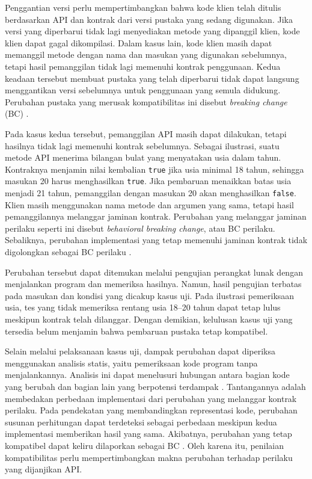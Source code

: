 Penggantian versi perlu mempertimbangkan bahwa kode klien telah ditulis berdasarkan API dan kontrak dari versi pustaka yang sedang digunakan. Jika versi yang diperbarui tidak lagi menyediakan metode yang dipanggil klien, kode klien dapat gagal dikompilasi. Dalam kasus lain, kode klien masih dapat memanggil metode dengan nama dan masukan yang digunakan sebelumnya, tetapi hasil pemanggilan tidak lagi memenuhi kontrak penggunaan. Kedua keadaan tersebut membuat pustaka yang telah diperbarui tidak dapat langsung menggantikan versi sebelumnya untuk penggunaan yang semula didukung. Perubahan pustaka yang merusak kompatibilitas ini disebut \textit{breaking change} (BC) \parencite{Ochoa2023}.

Pada kasus kedua tersebut, pemanggilan API masih dapat dilakukan, tetapi hasilnya tidak lagi memenuhi kontrak sebelumnya. Sebagai ilustrasi, suatu metode API menerima bilangan bulat yang menyatakan usia dalam tahun. Kontraknya menjamin nilai kembalian \texttt{true} jika usia minimal 18 tahun, sehingga masukan 20 harus menghasilkan \texttt{true}. Jika pembaruan menaikkan batas usia menjadi 21 tahun, pemanggilan dengan masukan 20 akan menghasilkan \texttt{false}. Klien masih menggunakan nama metode dan argumen yang sama, tetapi hasil pemanggilannya melanggar jaminan kontrak. Perubahan yang melanggar jaminan perilaku seperti ini disebut \textit{behavioral breaking change}, atau BC perilaku. Sebaliknya, perubahan implementasi yang tetap memenuhi jaminan kontrak tidak digolongkan sebagai BC perilaku \parencite{Ochoa2023,LiskovWing1994}.

Perubahan tersebut dapat ditemukan melalui pengujian perangkat lunak dengan menjalankan program dan memeriksa hasilnya. Namun, hasil pengujian terbatas pada masukan dan kondisi yang dicakup kasus uji. Pada ilustrasi pemeriksaan usia, tes yang tidak memeriksa rentang usia 18--20 tahun dapat tetap lulus meskipun kontrak telah dilanggar. Dengan demikian, kelulusan kasus uji yang tersedia belum menjamin bahwa pembaruan pustaka tetap kompatibel.

Selain melalui pelaksanaan kasus uji, dampak perubahan dapat diperiksa menggunakan analisis statis, yaitu pemeriksaan kode program tanpa menjalankannya. Analisis ini dapat menelusuri hubungan antara bagian kode yang berubah dan bagian lain yang berpotensi terdampak \parencite{Tip1995,RyderTip2001}. Tantangannya adalah membedakan perbedaan implementasi dari perubahan yang melanggar kontrak perilaku. Pada pendekatan yang membandingkan representasi kode, perubahan susunan perhitungan dapat terdeteksi sebagai perbedaan meskipun kedua implementasi memberikan hasil yang sama. Akibatnya, perubahan yang tetap kompatibel dapat keliru dilaporkan sebagai BC \parencite{Zhang2022Sembid}. Oleh karena itu, penilaian kompatibilitas perlu mempertimbangkan makna perubahan terhadap perilaku yang dijanjikan API\@.


